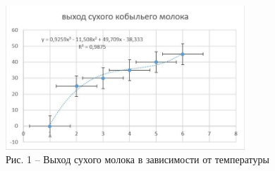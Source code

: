 \begin{figure}[H]
	\centering
	\includegraphics[width=0.8\textwidth]{assets/309-6}
	\caption*{Рис. 1 -- Выход сухого молока в зависимости от температуры}
\end{figure}


